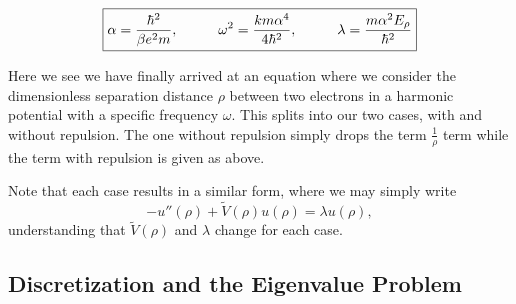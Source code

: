 \documentclass[11pt,a4paper]{article}
\begin{document}
\begin{equation}
\boxed{\alpha = \frac{\hbar^2}{\beta e^2m}, \hspace{1.0 cm} \omega^2 = \frac{km\alpha^4}{4\hbar^2}, \hspace{1.0 cm} \lambda = \frac{m\alpha^2E_{\rho}}{\hbar^2}}
\end{equation}{
Here we see we have finally arrived at an equation where we consider the dimensionless separation distance $\rho$ between two electrons in a harmonic potential with a specific frequency $\omega$. This splits into our two cases, with and without repulsion. The one without repulsion simply drops the term $\frac{1}{\rho}$ term while the term with repulsion is given as above.

Note that each case results in a similar form, where we may simply write
\begin{equation}
-u''(\rho) + \tilde{V}(\rho)u(\rho) = \lambda u(\rho),
\end{equation}
understanding that $\tilde{V}(\rho)$ and $\lambda$ change for each case.

\subsection{Discretization and the Eigenvalue Problem}

}
\end{document}
